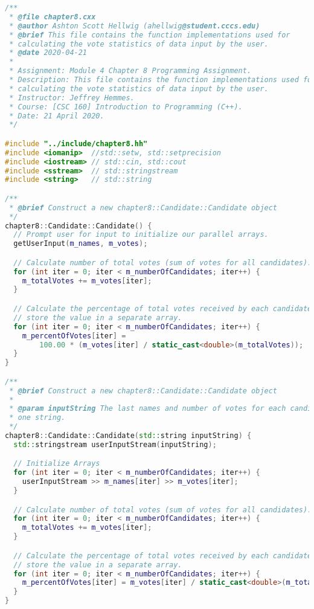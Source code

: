 \documentclass[12pt]{report}
\theoremstyle{definition}
\theoremstyle{plain}
\theoremstyle{plain}
\begin{document}
            \begin{lstlisting}[language=c++,caption={Ashton`s clang-format Result -- Macros}]
/**
 * @file chapter8.cxx
 * @author Ashton Scott Hellwig (ahellwig@student.cccs.edu)
 * @brief This file contains the function implementations used for
 * calculating the vote statistics of data input by the user.
 * @date 2020-04-21
 *
 * Assignment: Module 4 Chapter 8 Programming Assignment.
 * Description: This file contains the function implementations used for
 * calculating the vote statistics of data input by the user.
 * Instructor: Jeffrey Hemmes.
 * Course: [CSC 160] Introduction to Programming (C++).
 * Date: 21 April 2020.
 */

#include "../include/chapter8.hh"
#include <iomanip>  //std::setw, std::setprecision
#include <iostream> // std::cin, std::cout
#include <sstream>  // std::stringstream
#include <string>   // std::string

/**
 * @brief Construct a new chapter8::Candidate::Candidate object
 */
chapter8::Candidate::Candidate() {
  // Prompt user for input to initialize our parallel arrays.
  getUserInput(m_names, m_votes);

  // Calculate number of total votes (sum of votes for all candidates).
  for (int iter = 0; iter < m_numberOfCandidates; iter++) {
    m_totalVotes += m_votes[iter];
  }

  // Calculate the percentage of total votes received by each candidate and
  // store the value in a separate array.
  for (int iter = 0; iter < m_numberOfCandidates; iter++) {
    m_percentOfVotes[iter] =
        100.00 * (m_votes[iter] / static_cast<double>(m_totalVotes));
  }
}

/**
 * @brief Construct a new chapter8::Candidate::Candidate object
 *
 * @param inputString The last names and number of votes for each candidates in
 * one string.
 */
chapter8::Candidate::Candidate(std::string inputString) {
  std::stringstream userInputStream(inputString);

  // Initialize Arrays
  for (int iter = 0; iter < m_numberOfCandidates; iter++) {
    userInputStream >> m_names[iter] >> m_votes[iter];
  }

  // Calculate number of total votes (sum of votes for all candidates).
  for (int iter = 0; iter < m_numberOfCandidates; iter++) {
    m_totalVotes += m_votes[iter];
  }

  // Calculate the percentage of total votes received by each candidate and
  // store the value in a separate array.
  for (int iter = 0; iter < m_numberOfCandidates; iter++) {
    m_percentOfVotes[iter] = m_votes[iter] / static_cast<double>(m_totalVotes);
  }
}


\end{lstlisting}
\end{document}
